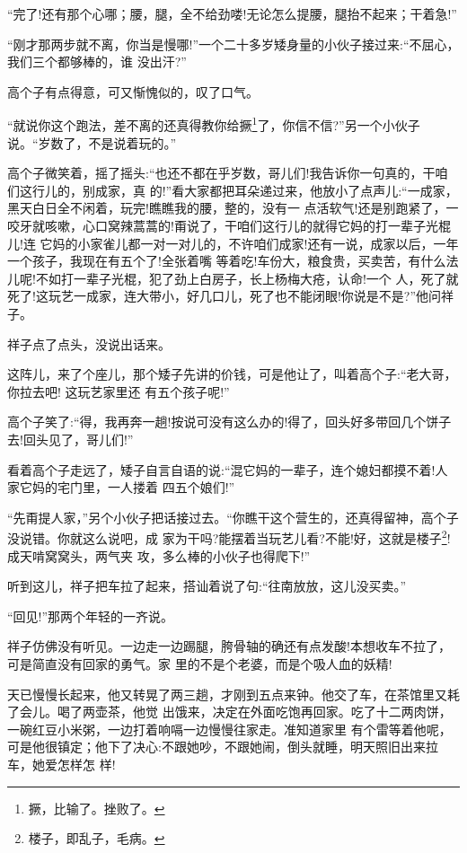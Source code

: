 \documentclass[11pt,a4paper,onecolumn]{article}
\begin{document}
``完了!还有那个心哪；腰，腿，全不给劲喽!无论怎么提腰，腿抬不起来；干着急!''

``刚才那两步就不离，你当是慢哪!''一个二十多岁矮身量的小伙子接过来:``不屈心，我们三个都够棒的，谁
没出汗?''

高个子有点得意，可又惭愧似的，叹了口气。

``就说你这个跑法，差不离的还真得教你给撅\footnote{撅，比输了。挫败了。}了，你信不信?''另一个小伙子
说。``岁数了，不是说着玩的。''

高个子微笑着，摇了摇头:``也还不都在乎岁数，哥儿们!我告诉你一句真的，干咱们这行儿的，别成家，真
的!''看大家都把耳朵递过来，他放小了点声儿:``一成家，黑天白日全不闲着，玩完!瞧瞧我的腰，整的，没有一
点活软气!还是别跑紧了，一咬牙就咳嗽，心口窝辣蒿蒿的!甭说了，干咱们这行儿的就得它妈的打一辈子光棍儿!连
它妈的小家雀儿都一对一对儿的，不许咱们成家!还有一说，成家以后，一年一个孩子，我现在有五个了!全张着嘴
等着吃!车份大，粮食贵，买卖苦，有什么法儿呢!不如打一辈子光棍，犯了劲上白房子，长上杨梅大疮，认命!一个
人，死了就死了!这玩艺一成家，连大带小，好几口儿，死了也不能闭眼!你说是不是?''他问祥子。

祥子点了点头，没说出话来。

这阵儿，来了个座儿，那个矮子先讲的价钱，可是他让了，叫着高个子:``老大哥，你拉去吧! 这玩艺家里还
有五个孩子呢!''

高个子笑了:``得，我再奔一趟!按说可没有这么办的!得了，回头好多带回几个饼子去!回头见了，哥儿们!''

看着高个子走远了，矮子自言自语的说:``混它妈的一辈子，连个媳妇都摸不着!人家它妈的宅门里，一人搂着
四五个娘们!''

``先甭提人家，''另个小伙子把话接过去。``你瞧干这个营生的，还真得留神，高个子没说错。你就这么说吧，成
家为干吗?能摆着当玩艺儿看?不能!好，这就是楼子\footnote{楼子，即乱子，毛病。}!成天啃窝窝头，两气夹
攻，多么棒的小伙子也得爬下!''

听到这儿，祥子把车拉了起来，搭讪着说了句:``往南放放，这儿没买卖。''

``回见!''那两个年轻的一齐说。

祥子仿佛没有听见。一边走一边踢腿，胯骨轴的确还有点发酸!本想收车不拉了，可是简直没有回家的勇气。家
里的不是个老婆，而是个吸人血的妖精!

天已慢慢长起来，他又转晃了两三趟，才刚到五点来钟。他交了车，在茶馆里又耗了会儿。喝了两壶茶，他觉
出饿来，决定在外面吃饱再回家。吃了十二两肉饼，一碗红豆小米粥，一边打着响嗝一边慢慢往家走。准知道家里
有个雷等着他呢，可是他很镇定；他下了决心:不跟她吵，不跟她闹，倒头就睡，明天照旧出来拉车，她爱怎样怎
样!
\end{document}
